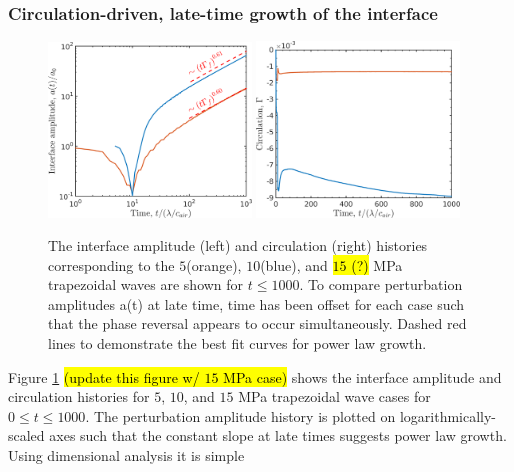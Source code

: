 \subsubsection{Circulation-driven, late-time growth of the interface}
\begin{figure}[h]
  \centering
  \includegraphics[width=0.48\textwidth]{./figs/lung_figs/interface_multi-amp_loglog_roe_t1000}
  \includegraphics[width=0.48\textwidth]{./figs/lung_figs/circulation_multi-amp_roe_t1000}
  \caption[The interface and circulation dependence on wave amplitude
  at long time]{The interface amplitude (left) and circulation (right)
    histories corresponding to the $5$(orange), $10$(blue), and
    \hl{$15$ (?)} MPa trapezoidal waves are shown for $t\leq 1000$. To
    compare perturbation amplitudes a(t) at late time,
    time has been offset for each case such that the phase reversal appears to occur
    simultaneously. Dashed red lines to demonstrate the best fit
    curves for power law growth.}
  \label{fig:trapz_circ_interface_loglog}
\end{figure}
% 
Figure \ref{fig:trapz_circ_interface_loglog} \hl{(update this figure
  w/ $15$ MPa case)} shows the interface amplitude and circulation
histories for $5$, $10$, and $15$ MPa trapezoidal wave cases for
$0 \leq t\leq 1000$. The perturbation amplitude history is plotted on
logarithmically-scaled axes such that the constant slope at late times
suggests power law growth. Using dimensional analysis it is simple
